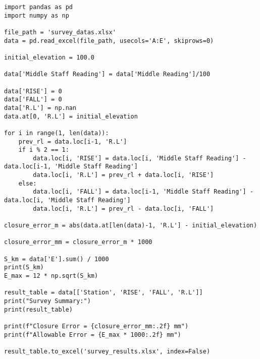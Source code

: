 \documentclass[12pt]{report}
\begin{document}
\begin{lstlisting}[caption={Code for Calculations}]
import pandas as pd
import numpy as np

file_path = 'survey_datas.xlsx'
data = pd.read_excel(file_path, usecols='A:E', skiprows=0)

initial_elevation = 100.0

data['Middle Staff Reading'] = data['Middle Reading']/100

data['RISE'] = 0
data['FALL'] = 0
data['R.L'] = np.nan
data.at[0, 'R.L'] = initial_elevation

for i in range(1, len(data)):
    prev_rl = data.loc[i-1, 'R.L']
    if i % 2 == 1:
        data.loc[i, 'RISE'] = data.loc[i, 'Middle Staff Reading'] - data.loc[i-1, 'Middle Staff Reading']
        data.loc[i, 'R.L'] = prev_rl + data.loc[i, 'RISE']
    else:
        data.loc[i, 'FALL'] = data.loc[i-1, 'Middle Staff Reading'] - data.loc[i, 'Middle Staff Reading']
        data.loc[i, 'R.L'] = prev_rl - data.loc[i, 'FALL']

closure_error_m = abs(data.at[len(data)-1, 'R.L'] - initial_elevation)

closure_error_mm = closure_error_m * 1000

S_km = data['E'].sum() / 1000
print(S_km)
E_max = 12 * np.sqrt(S_km)

result_table = data[['Station', 'RISE', 'FALL', 'R.L']]
print("Survey Summary:")
print(result_table)

print(f"Closure Error = {closure_error_mm:.2f} mm")
print(f"Allowable Error = {E_max * 1000:.2f} mm")

result_table.to_excel('survey_results.xlsx', index=False)

\end{lstlisting}
\end{document}
